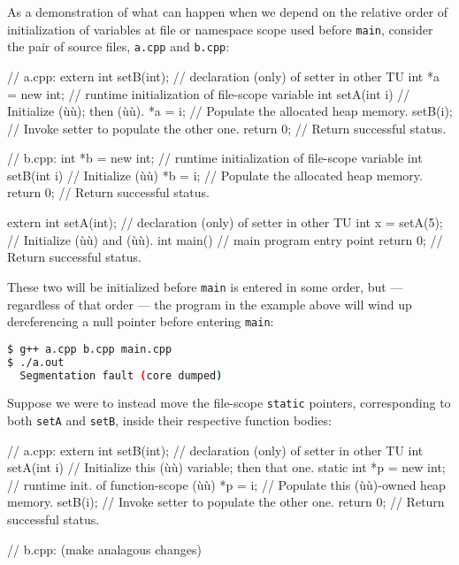 As a demonstration of what can happen when we depend on the relative
order of initialization of variables at file or
namespace scope used before \lstinline!main!, consider the
 pair of source files, \lstinline!a.cpp! and
\lstinline!b.cpp!:

\begin{emcppslisting}
// a.cpp:
extern int setB(int);  // declaration (only) of setter in other TU
int *a = new int;      // runtime initialization of file-scope variable
int setA(int i)        // Initialize (ù{}ù); then (ù{}ù).
{
    *a = i;            // Populate the allocated heap memory.
    setB(i);           // Invoke setter to populate the other one.
    return 0;          // Return successful status.
}

// b.cpp:
int *b = new int;      // runtime initialization of file-scope variable
int setB(int i)        // Initialize (ù{}ù)
{
    *b = i;            // Populate the allocated heap memory.
    return 0;          // Return successful status.
}

extern int setA(int);  // declaration (only) of setter in other TU
int x = setA(5);       // Initialize (ù{}ù) and (ù{}ù).
int main()             // main program entry point
{
    return 0;          // Return successful status.
}
\end{emcppslisting}

\noindent These two  will be initialized before \lstinline!main! is
entered in some order, but --- regardless of that order --- the program
in the example above will wind up dereferencing a null pointer
before entering \lstinline!main!:

\begin{lstlisting}[language=bash]
$ g++ a.cpp b.cpp main.cpp
$ ./a.out
  Segmentation fault (core dumped)
\end{lstlisting}

\noindent Suppose we were to instead move the file-scope \lstinline!static! pointers,
corresponding to both \lstinline!setA! and \lstinline!setB!, inside their
respective function bodies:

\begin{emcppslisting}
// a.cpp:
extern int setB(int);  // declaration (only) of setter in other TU
int setA(int i)        // Initialize this (ù{}ù) variable; then that one.
{
    static int *p = new int;  // runtime init. of function-scope (ù{}ù)
    *p = i;                   // Populate this (ù{}ù)-owned heap memory.
    setB(i);                  // Invoke setter to populate the other one.
    return 0;                 // Return successful status.
}

// b.cpp: (make analagous changes)
\end{emcppslisting}

